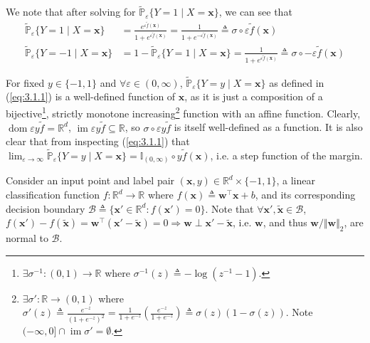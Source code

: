 \documentclass{article}
\numberwithin{equation}{section}
\begin{document}
We note that after solving for $ \tilde{\mathbb{P}}_\varepsilon
\{Y = 1 \mid X = \mathbf{x}\} $, we can see that
\begin{equation*}
    \begin{split}
        \tilde{\mathbb{P}}_\varepsilon\{Y = 1 \mid X = \mathbf{x}\} & =
        \frac{
            e^{\varepsilon\tilde{f}(\mathbf{x})}
        }{
            1 + e^{\varepsilon\tilde{f}(\mathbf{x})}
        } =
        \frac{1}{1 + e^{-\varepsilon\tilde{f}(\mathbf{x})}} \triangleq
        \sigma\circ\varepsilon\tilde{f}(\mathbf{x}) \\
        \tilde{\mathbb{P}}_\varepsilon\{Y = -1 \mid X = \mathbf{x}\} & =
        1 - \tilde{\mathbb{P}}_\varepsilon\{Y = 1 \mid X = \mathbf{x}\} =
        \frac{1}{1 + e^{\varepsilon\tilde{f}(\mathbf{x})}} \triangleq
        \sigma\circ -\varepsilon\tilde{f}(\mathbf{x})
    \end{split}
\end{equation*}

For fixed $ y \in \{-1, 1\} $ and $ \forall \varepsilon \in (0, \infty) $,
$ \tilde{\mathbb{P}}_\varepsilon\{Y = y \mid X = \mathbf{x}\} $ as defined
in (\ref{eq:3.1.1}) is a well-defined function of $ \mathbf{x} $, as it is
just a composition of a bijective\footnote{
    $ \exists\sigma^{-1} : (0, 1) \rightarrow \mathbb{R} $ where
    $ \sigma^{-1}(z) \triangleq -\log\left(z^{-1} - 1\right) $.
}, strictly monotone increasing\footnote{
    $ \exists\sigma': \mathbb{R} \rightarrow (0, 1) $ where
    $ \sigma'(z) \triangleq \frac{e^{-z}}{(1 + e^{-z})^2} =
    \frac{1}{1 + e^{-z}}\left(\frac{e^{-z}}{1 + e^{-z}}\right) \triangleq
    \sigma(z)(1 - \sigma(z)) $. Note $ (-\infty, 0] \cap
    \operatorname{im}\sigma' = \emptyset $.
}
function with an affine function. Clearly, $ \operatorname{dom}\varepsilon
y\tilde{f} = \mathbb{R}^d $, $ \operatorname{im}\varepsilon
y\tilde{f} \subseteq \mathbb{R} $, so $ \sigma\circ\varepsilon y\tilde{f} $
is itself well-defined as a function. It is also clear that from inspecting
(\ref{eq:3.1.1}) that $ \lim_{\varepsilon \rightarrow \infty}
\tilde{\mathbb{P}}_\varepsilon\{Y = y \mid X = \mathbf{x}\} =
\mathbb{I}_{(0, \infty)}\circ y\tilde{f}(\mathbf{x}) $, i.e. a step function
of the margin.


Consider an input point and label pair $ (\mathbf{x}, y) \in \mathbb{R}^d
\times \{-1, 1\} $, a linear classification function
$ f : \mathbb{R}^d \rightarrow \mathbb{R} $ where
$ f(\mathbf{x}) \triangleq \mathbf{w}^\top\mathbf{x} + b $, and its
corresponding decision boundary $ \mathcal{B} \triangleq \{\mathbf{x}' \in
\mathbb{R}^d : f(\mathbf{x}') = 0\} $. Note that $ \forall \mathbf{x}',
\tilde{\mathbf{x}} \in \mathcal{B} $, $ f(\mathbf{x}') -
f(\tilde{\mathbf{x}}) = \mathbf{w}^\top(\mathbf{x}' - \tilde{\mathbf{x}}) =
0 \Rightarrow \mathbf{w} \perp \mathbf{x}' - \tilde{\mathbf{x}} $, i.e.
$ \mathbf{w} $, and thus $ \mathbf{w} / \Vert\mathbf{w}\Vert_2 $, are
normal to $ \mathcal{B} $.
\end{document}
